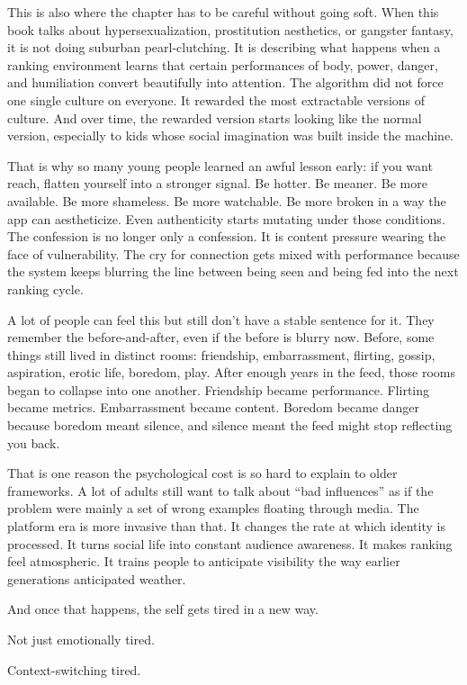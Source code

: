 \documentclass[
  american,
  12pt,
  letterpaper,
]{article}
\begin{document}
This is also where the chapter has to be careful without going soft.
When this book talks about hypersexualization, prostitution aesthetics,
or gangster fantasy, it is not doing suburban pearl-clutching. It is
describing what happens when a ranking environment learns that certain
performances of body, power, danger, and humiliation convert beautifully
into attention. The algorithm did not force one single culture on
everyone. It rewarded the most extractable versions of culture. And over
time, the rewarded version starts looking like the normal version,
especially to kids whose social imagination was built inside the
machine.

That is why so many young people learned an awful lesson early: if you
want reach, flatten yourself into a stronger signal. Be hotter. Be
meaner. Be more available. Be more shameless. Be more watchable. Be more
broken in a way the app can aestheticize. Even authenticity starts
mutating under those conditions. The confession is no longer only a
confession. It is content pressure wearing the face of vulnerability.
The cry for connection gets mixed with performance because the system
keeps blurring the line between being seen and being fed into the next
ranking cycle.

A lot of people can feel this but still don't have a stable sentence for
it. They remember the before-and-after, even if the before is blurry
now. Before, some things still lived in distinct rooms: friendship,
embarrassment, flirting, gossip, aspiration, erotic life, boredom, play.
After enough years in the feed, those rooms began to collapse into one
another. Friendship became performance. Flirting became metrics.
Embarrassment became content. Boredom became danger because boredom
meant silence, and silence meant the feed might stop reflecting you
back.

That is one reason the psychological cost is so hard to explain to older
frameworks. A lot of adults still want to talk about ``bad influences''
as if the problem were mainly a set of wrong examples floating through
media. The platform era is more invasive than that. It changes the rate
at which identity is processed. It turns social life into constant
audience awareness. It makes ranking feel atmospheric. It trains people
to anticipate visibility the way earlier generations anticipated
weather.

And once that happens, the self gets tired in a new way.

Not just emotionally tired.

Context-switching tired.
\end{document}
